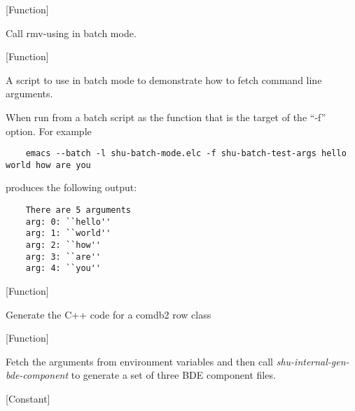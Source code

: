 \vspace{1em}
\noindent
{}
\usebox{\funcname}
 \hfill [Function]

\begin{doc-string}
Call rmv-using in batch mode.
\end{doc-string}

\vspace{1em}
\noindent
{}
\usebox{\funcname}
 \hfill [Function]

\begin{doc-string}
A script to use in batch mode to demonstrate how to fetch command line arguments.

When run from a batch script as the function that is the target of the ``-f'' option.
For example

\small{\begin{verbatim}
    emacs --batch -l shu-batch-mode.elc -f shu-batch-test-args hello world how are you
\end{verbatim}}

produces the following output:
\small{\begin{verbatim}
    There are 5 arguments
    arg: 0: ``hello''
    arg: 1: ``world''
    arg: 2: ``how''
    arg: 3: ``are''
    arg: 4: ``you''
\end{verbatim}}
\end{doc-string}

\vspace{1em}
\noindent
{}
\usebox{\funcname}
 \hfill [Function]

\begin{doc-string}
Generate the C++ code for a comdb2 row class
\end{doc-string}

\vspace{1em}
\noindent
{}
\usebox{\funcname}
 \hfill [Function]

\begin{doc-string}
Fetch the arguments from environment variables and then call
\emph{shu-internal-gen-bde-component} to generate a set of three BDE component
files.
\end{doc-string}

\vspace{1em}
\noindent
{}
\usebox{\funcname}
 \hfill [Constant]

